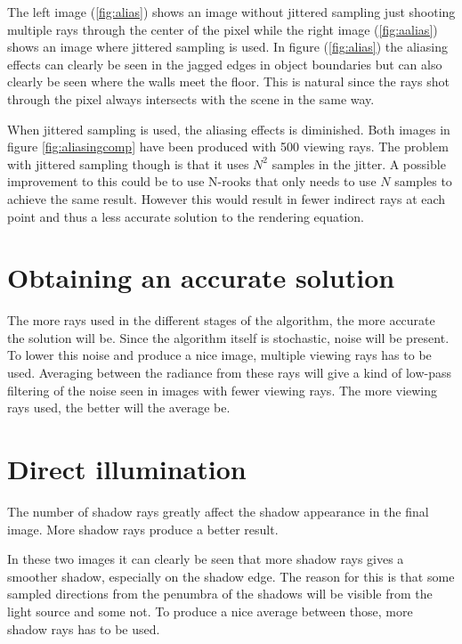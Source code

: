\documentclass[a4paper]{report}
\begin{document}
The left image (\ref{fig:alias}) shows an image
without jittered sampling just shooting multiple rays through the
center of the pixel while the right image (\ref{fig:aalias}) shows an image where
jittered sampling is used. In figure (\ref{fig:alias}) the aliasing
effects can clearly be seen in the jagged edges in object boundaries
but can also clearly be seen where the walls meet the floor. This is
natural since the rays shot through the pixel always intersects with
the scene in the same way. 

When jittered sampling is used, the aliasing effects is
diminished. Both images in figure \ref{fig:aliasingcomp} have been
produced with 500 viewing rays. The problem with jittered sampling
though is that it uses \(N^2\) samples in the jitter. A possible
improvement to this could be to use N-rooks that only needs to use
\(N\) samples to achieve the same result. However this would result in
fewer indirect rays at each point and thus a less accurate solution to
the rendering equation.

\section{Obtaining an accurate solution}

The more rays used in the different stages of the algorithm, the more
accurate the solution will be. Since the algorithm itself is
stochastic, noise will be present. To lower this noise and produce a
nice image, multiple viewing rays has to be used. Averaging between
the radiance from these rays will give a kind of low-pass filtering of
the noise seen in images with fewer viewing rays. The more viewing
rays used, the better will the average be.


\section{Direct illumination}

The number of shadow rays greatly affect the shadow appearance in the
final image. More shadow rays produce a better result.


In these two images it can clearly be seen that more shadow rays gives
a smoother shadow, especially on the shadow edge. The reason for this
is that some sampled directions from the penumbra of the shadows will
be visible from the light source and some not. To produce a nice
average between those, more shadow rays has to be used. 
\end{document}
